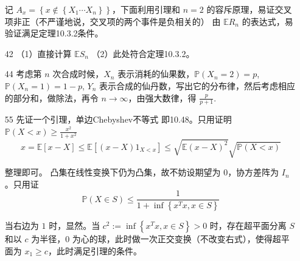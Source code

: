 \begin{enumerate}
记 $A_{x}=\left\{x \notin\left\{X_{1} \cdots X_{n}\right\}\right\}$，下面利用引理和 $n=2$ 的容斥原理，易证交叉项非正（不严谨地说，交叉项的两个事件是负相关的）
由 $\mathbb{E} R_{n}$ 的表达式，易验证满足定理10.3.2条件。

\item[42]
（1）直接计算 $\mathbb{E} S_{n}$
（2）此处符合定理10.3.2。

\item[44]
考虑第 $n$ 次合成时候，$X_{n}$ 表示消耗的仙果数，$\mathbb{P}(X_{n}=2)=p$, 
$\mathbb{P}\left(X_{n}=1\right)=1-p$, $Y_{n}$ 表示合成的仙丹数，写出它的分布律，然后考虑相应的部分和，做除法，再令 $n \rightarrow \infty$，由强大数律，得 $\frac{p}{p+1}$.

\item[55]
先证一个引理，单边Chebyshev不等式 即10.48。只用证明 $\mathbb{P}(X<x) \geq \frac{x^{2}}{1+x^{2}}$
$$x=\mathbb{E}[x-X] \leq \mathbb{E}\left[(x-X) 1_{X<x}\right] \leq \sqrt{\mathbb{E}(x-X)^{2}} \sqrt{\mathbb{P}(X<x)}$$

整理即可。
凸集在线性变换下仍为凸集，故不妨设期望为 $0$，协方差阵为 $I_{n}$。只用证
$$\mathbb{P}(X \in S) \leq \frac{1}{1+\inf \left\{x^{T} x, x \in S\right\}}$$

当右边为 $1$ 时，显然。当 $c^{2}:=\inf \left\{x^{T} x, x \in S\right\}>0$ 时，存在超平面分离 $S$ 和以 $c$ 为半径，$0$ 为心的球，此时做一次正交变换（不改变右式），使得超平面为 $x_{1} \geq c$，此时满足引理的条件。
\end{enumerate}

